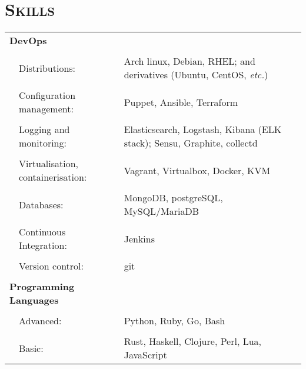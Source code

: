\documentclass[a4paper,10pt]{article} %
\begin{document}

\section{\textsc{Skills}}
\begin{tabularx}{\textwidth}{p{0.3cm}|p{4cm}X}
\multicolumn{2}{l}{\textbf{DevOps}} & \\
\multicolumn{3}{c}{} \\ %
   & Distributions:                      & Arch linux, Debian, RHEL; and derivatives (Ubuntu, CentOS, \emph{etc.}) \\
     \\
   & Configuration management:           & Puppet, Ansible, Terraform \\
     \\
   & Logging and monitoring:             & Elasticsearch, Logstash, Kibana (ELK stack); Sensu, Graphite, collectd \\
     \\
   & Virtualisation, containerisation:   & Vagrant, Virtualbox, Docker, KVM \\
     \\
   & Databases:                          & MongoDB, postgreSQL, MySQL/MariaDB \\
     \\
   & Continuous Integration:             & Jenkins \\
     \\
   & Version control:                    & git \\
\multicolumn{3}{c}{} \\ %
\multicolumn{2}{l}{\textbf{Programming Languages}}      & \\
\multicolumn{3}{c}{} \\ %
  &  Advanced:                           & Python, Ruby, Go, Bash \\
     \\
  &  Basic:                              & Rust, Haskell, Clojure, Perl, Lua, JavaScript \\
\end{tabularx}
\end{document}
